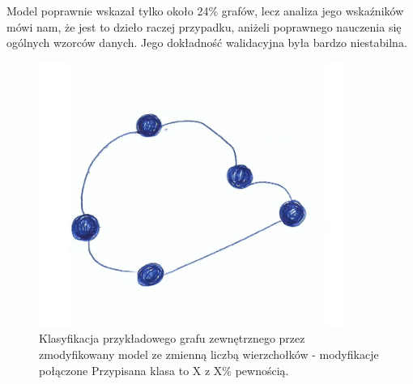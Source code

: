 Model poprawnie wskazał tylko około 24\% grafów, lecz analiza jego wskaźników mówi nam,
że jest to dzieło raczej przypadku, aniżeli poprawnego nauczenia się ogólnych wzorców danych.
Jego dokładność walidacyjna była bardzo niestabilna.

\begin{figure}[ht]
	\centering
	\includegraphics[width=10cm]{../graph_classification/test_graphs/drawn/cycle-9.png}
	\caption{Klasyfikacja przykładowego grafu zewnętrznego przez zmodyfikowany model ze zmienną liczbą wierzchołków - modyfikacje połączone
		Przypisana klasa to X z X\% pewnością.}
	\label{Fig:tests-cv-2d}
\end{figure}
\FloatBarrier